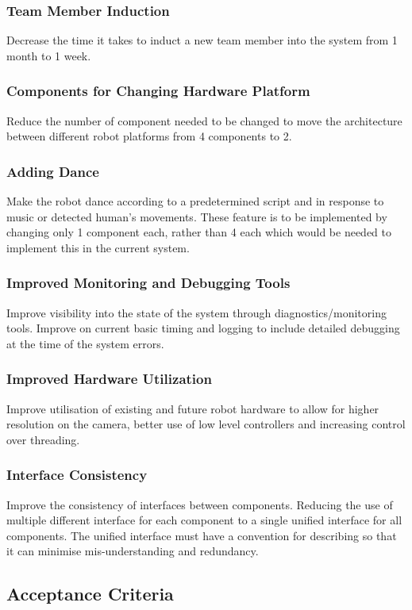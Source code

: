\documentclass[english,12pt]{scrartcl}
\begin{document}
			\subsubsection{Team Member Induction}
				Decrease the time it takes to induct a new team member into the system from 1 month to 1 week.
			\subsubsection{Components for Changing Hardware Platform}
				Reduce the number of component needed to be changed to move the architecture between different robot platforms from 4 components to 2.
			\subsubsection{Adding Dance}
				Make the robot dance according to a predetermined script and in response to music or detected human’s movements. These feature is to be implemented by changing only 1 component each, rather than 4 each which would be needed to implement this in the current system. 

			\subsubsection{Improved Monitoring and Debugging Tools}
				 Improve visibility into the state of the system through diagnostics/monitoring tools. Improve on current basic timing and logging to include detailed debugging at the time of the system errors.
			\subsubsection{Improved Hardware Utilization}
				 Improve utilisation of existing and future robot hardware to allow for higher resolution on the camera, better use of low level controllers and increasing control over threading.
			\subsubsection{Interface Consistency}
				 Improve the consistency of interfaces between components. Reducing the use of multiple different interface for each component to a single unified interface for all components. The unified interface must have a convention for describing so that it can minimise mis-understanding and redundancy.
				
		\subsection {Acceptance Criteria}
\end{document}
